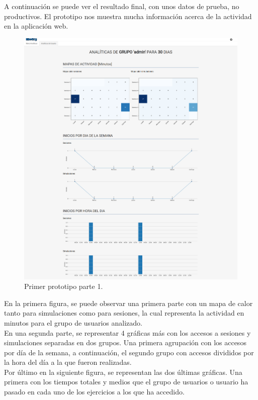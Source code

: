 \documentclass[11pt,a4paper]{book}
\begin{document}
		A continuación se puede ver el resultado final, con unos datos de prueba, no productivos. El prototipo nos muestra mucha información acerca de la actividad en la aplicación web.\\
		\begin{figure}[H]
			\centering
			\includegraphics[width=14cm, keepaspectratio]{img/primer_prototipo_1.png}
			\caption{Primer prototipo parte 1.}
			\label{fig:primer_prototipo_1}
		\end{figure}
		En la primera figura, se puede observar una primera parte con un mapa de calor tanto para simulaciones como para sesiones, la cual representa la actividad en minutos para el grupo de usuarios analizado.\\
		En una segunda parte, se representar 4 gráficas más con los accesos a sesiones y simulaciones separadas en dos grupos. Una primera agrupación con los accesos por día de la semana, a continuación, el segundo grupo con accesos divididos por la hora del día a la que fueron realizadas.\\
		
		Por último en la siguiente figura, se representan las dos últimas gráficas. Una primera con los tiempos totales y medios que el grupo de usuarios o usuario ha pasado en cada uno de los ejercicios a los que ha accedido.\\
		
\end{document}
